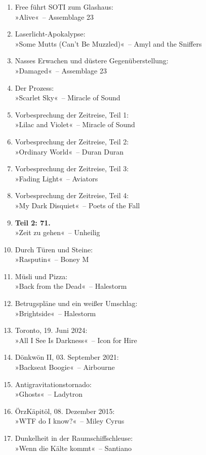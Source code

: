 \begin{enumerate}
    \item Free führt SOTI zum Glashaus:\\ »Alive«~– Assemblage 23
    \item Laserlicht-Apokalypse:\\ »Some Mutts (Can’t Be Muzzled)«~– Amyl and the Sniffers
    \item Nasses Erwachen und düstere Gegenüberstellung:\\ »Damaged«~– Assemblage 23
    \item Der Prozess:\\ »Scarlet Sky«~– Miracle of Sound
    \item Vorbesprechung der Zeitreise, Teil 1:\\ »Lilac and Violet«~– Miracle of Sound
    \item Vorbesprechung der Zeitreise, Teil 2:\\ »Ordinary World«~– Duran Duran
    \item Vorbesprechung der Zeitreise, Teil 3:\\ »Fading Light«~– Aviators
    \item Vorbesprechung der Zeitreise, Teil 4:\\ »My Dark Disquiet«~– Poets of the Fall
    \item \textbf{Teil 2: 71.}\\ »Zeit zu gehen«~– Unheilig
    \item Durch Türen und Steine:\\ »Rasputin«~– Boney M
    \item Müsli und Pizza:\\ »Back from the Dead«~– Halestorm
    \item Betrugspläne und ein weißer Umschlag:\\ »Brightside«~– Halestorm
    \item Toronto, 19. Juni 2024:\\ »All I See Is Darkness«~– Icon for Hire
    \item Dönkwön II, 03. September 2021:\\ »Backseat Boogie«~– Airbourne
    \item Antigravitationstornado:\\ »Ghosts«~– Ladytron
    \item ÖrzKäpitöl, 08. Dezember 2015:\\ »WTF do I know?«~– Miley Cyrus
    \item Dunkelheit in der Raumschiffschleuse:\\ »Wenn die Kälte kommt«~– Santiano

\end{enumerate}
